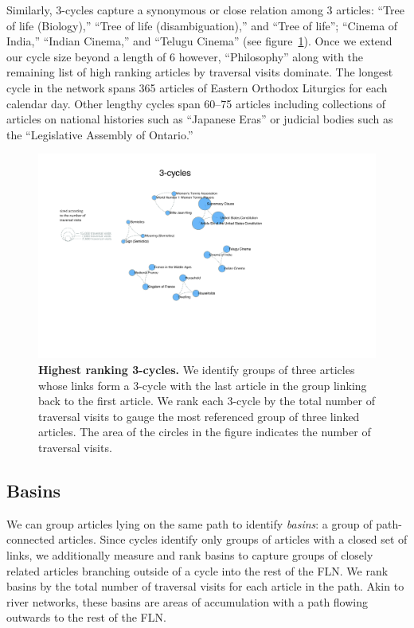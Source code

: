 \documentclass[pre,twocolumn,twoside,superscriptaddress,floatfix, aps, 10pt]{revtex4-1}
\begin{document}
Similarly, 3-cycles capture a synonymous or close relation among 3 articles: ``Tree of life (Biology),'' ``Tree of life (disambiguation),'' 
and ``Tree of life''; ``Cinema of India,'' ``Indian Cinema,'' and ``Telugu Cinema''
(see figure~\ref{fig:3-cycles}).
Once we extend our cycle size beyond a length of 6 however, 
``Philosophy'' along with the remaining list of high ranking articles by traversal visits dominate.
The longest cycle in the network spans 365 articles of Eastern Orthodox Liturgics for each calendar day.
Other lengthy cycles span 60--75 articles including collections of articles on national histories such as ``Japanese Eras'' 
or judicial bodies such as the ``Legislative Assembly of Ontario.''

\begin{figure}[tp!]
  \centering	
  \includegraphics[width=\textwidth]{graphics/3_cycles.pdf}
  \caption{
    \textbf{Highest ranking 3-cycles.}
    We identify groups of three articles whose links form a 3-cycle with the 
    last article in the group linking back to the first article.
    We rank each 3-cycle by the total number of traversal visits to gauge
    the most referenced group of three linked articles. 
    The area of the circles in the figure indicates the number of traversal visits. 
  }
  \label{fig:3-cycles}
\end{figure}






\subsection{Basins}

We can group articles lying on the same path to identify {\it basins}: 
a group of path-connected articles.
Since cycles identify only groups of articles with a closed set of links, 
we additionally measure and rank basins to capture groups of closely related
articles branching outside of a cycle into the rest of the FLN.
We rank basins by the total number of traversal visits for each article in the path. 
Akin to river networks, these basins are areas of accumulation with a path 
flowing outwards to the rest of the FLN.
\end{document}
